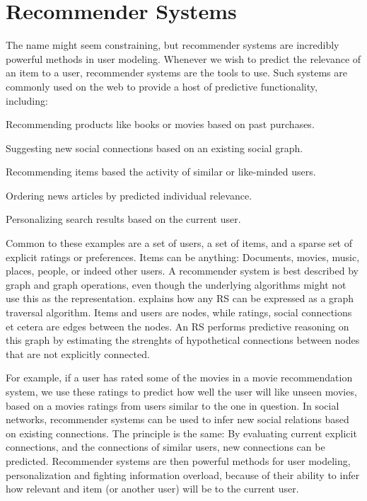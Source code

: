 \section{Recommender Systems}

The name might seem constraining, but recommender systems are incredibly powerful methods in user modeling.
Whenever we wish to predict the relevance of an item to a user, recommender systems are the tools to use.
Such systems are commonly used on the web to provide a host of predictive functionality, including:

\begin{itemize*}
  \item Recommending products like books or movies based on past purchases.
  \item Suggesting new social connections based on an existing social graph.
  \item Recommending items based the activity of similar or like-minded users.
  \item Ordering news articles by predicted individual relevance.
  \item Personalizing search results based on the current user.
\end{itemize*}

Common to these examples are a set of users, a set of items, and a sparse set of explicit ratings or preferences.
Items can be anything: Documents, movies, music, places, people, or indeed other users.
A recommender system is best described by graph and graph operations, even though the underlying algorithms might not use this as the representation.
\cite{Mirza2003} explains how any RS can be expressed as a graph traversal algorithm.
Items and users are nodes, while ratings, social connections et cetera are edges between the nodes.
An RS performs predictive reasoning on this graph by estimating the strenghts of hypothetical connections between nodes that are not explicitly connected.

For example, if a user has rated some of the movies in a movie recommendation system, 
we use these ratings to predict how well the user will like unseen movies,
based on a movies ratings from users similar to the one in question.
In social networks, recommender systems can be used to infer new social relations 
based on existing connections. The principle is the same: By evaluating current explicit
connections, and the connections of similar users, new connections can be predicted.
Recommender systems are then powerful methods for user modeling, personalization and fighting information overload,
because of their ability to infer how relevant and item (or another user) will be to the current user.

